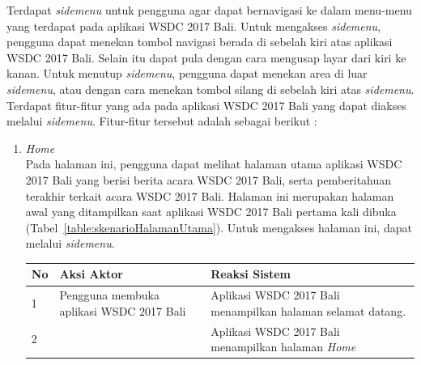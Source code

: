 Terdapat {\it sidemenu} untuk pengguna agar dapat bernavigasi ke dalam menu-menu yang terdapat pada aplikasi WSDC 2017 Bali. Untuk mengakses {\it sidemenu}, pengguna dapat menekan tombol navigasi berada di sebelah kiri atas aplikasi WSDC 2017 Bali. Selain itu dapat pula dengan cara mengusap layar dari kiri ke kanan. Untuk menutup {\it sidemenu}, pengguna dapat menekan area di luar {\it sidemenu}, atau dengan cara menekan tombol silang di sebelah kiri atas {\it sidemenu}. Terdapat fitur-fitur yang ada pada aplikasi WSDC 2017 Bali yang dapat diakses melalui {\it sidemenu}. Fitur-fitur tersebut adalah sebagai berikut :
\begin{enumerate}
	\item \textit{Home} \\
	Pada halaman ini, pengguna dapat melihat halaman utama aplikasi WSDC 2017 Bali yang berisi berita acara WSDC 2017 Bali, serta pemberitahuan terakhir terkait acara WSDC 2017 Bali. Halaman ini merupakan halaman awal yang ditampilkan saat aplikasi WSDC 2017 Bali pertama kali dibuka (Tabel~\ref{table:skenarioHalamanUtama}). Untuk mengakses halaman ini, dapat melalui \textit{sidemenu}.
		\begin{table}[H]
			\centering
			\begin{tabular}{|p{0.5cm}|p{7cm}|p{7cm}|}
				\hline
				No & Aksi Aktor                               & Reaksi Sistem                                          \\ \hline
				1  & Pengguna membuka aplikasi WSDC 2017 Bali & Aplikasi WSDC 2017 Bali menampilkan halaman selamat datang. \\ \hline
				2  &                                          & Aplikasi WSDC 2017 Bali menampilkan halaman \textit{Home}           \\ \hline

\end{tabular}
\end{table}
\end{enumerate}
